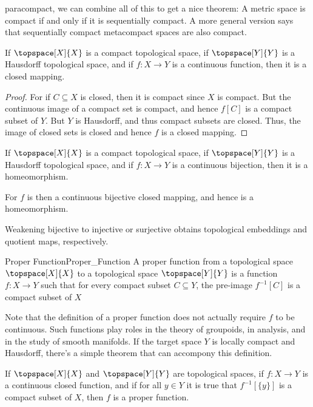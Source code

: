     paracompact, we can combine all of this to get a nice theorem: A metric
    space is compact if and only if it is sequentially compact. A more
    general version says that sequentially compact metacompact spaces are
    also compact.
    \begin{theorem}
        If $\topspace[X]{X}$ is a compact topological space, if
        $\topspace[Y]{Y}$ is a Hausdorff topological space, and if
        $f:X\rightarrow{Y}$ is a continuous function, then it is a closed
        mapping.
    \end{theorem}
    \begin{proof}
        For if $C\subseteq{X}$ is closed, then it is compact since $X$ is
        compact. But the continuous image of a compact set is compact, and
        hence $f[C]$ is a compact subset of $Y$. But $Y$ is Hausdorff, and
        thus compact subsets are closed. Thus, the image of closed sets is
        closed and hence $f$ is a closed mapping.
    \end{proof}
    \begin{theorem}
        If $\topspace[X]{X}$ is a compact topological space, if
        $\topspace[Y]{Y}$ is a Hausdorff topological space, and if
        $f:X\rightarrow{Y}$ is a continuous bijection, then it is a
        homeomorphism.
    \end{theorem}
    \begin{theorem}
        For $f$ is then a continuous bijective closed mapping, and hence
        is a homeomorphism.
    \end{theorem}
    Weakening bijective to injective or surjective obtains topological
    embeddings and quotient maps, respectively.
    \begin{fdefinition}{Proper Function}{Proper_Function}
        A proper function from a topological space $\topspace[X]{X}$ to a
        topological space $\topspace[Y]{Y}$ is a function
        $f:X\rightarrow{Y}$ such that for every compact subset
        $C\subseteq{Y}$, the pre-image $f^{\minus{1}}[C]$ is a compact
        subset of $X$
    \end{fdefinition}
    Note that the definition of a proper function does not actually require
    $f$ to be continuous. Such functions play roles in the theory of
    groupoids, in analysis, and in the study of smooth manifolds. If the
    target space $Y$ is locally compact and Hausdorff, there's a simple
    theorem that can accompony this definition.
    \begin{theorem}
        If $\topspace[X]{X}$ and $\topspace[Y]{Y}$ are topological spaces,
        if $f:X\rightarrow{Y}$ is a continuous closed function, and if for
        all $y\in{Y}$ it is true that $f^{\minus{1}}[\{y\}]$ is a compact
        subset of $X$, then $f$ is a proper function.
    \end{theorem}
